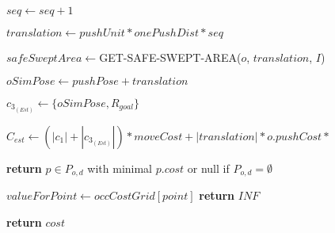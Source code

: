 \begin{algorithm}[H]
\begin{algorithmic}[1]
          \State $seq \gets seq + 1$

          \State $translation \gets pushUnit * onePushDist * seq$

          \State $safeSweptArea \gets $GET-SAFE-SWEPT-AREA($o$, $translation$, $I$)

          \State $oSimPose \gets pushPose + translation$

          \State {}

          \State $c_{3_{(Est)}} \gets \{oSimPose, R_{goal}\}$

          \State $C_{est} \gets (|c_{1}| + |c_{3_{(Est)}}|) * moveCost + |translation| * o.pushCost *$ 

        \EndWhile

      \EndFor

    \State \textbf{return} $p \in P_{o,d}$ with minimal $p.cost$ or null if $P_{o,d} = \emptyset$

    \EndProcedure



        \State $valueForPoint \gets occCostGrid[point]$
          \State \textbf{return} $INF$
        \EndIf
      \EndFor

      \State \textbf{return} $cost$
    \EndProcedure

  \end{algorithmic}
\end{algorithm}
